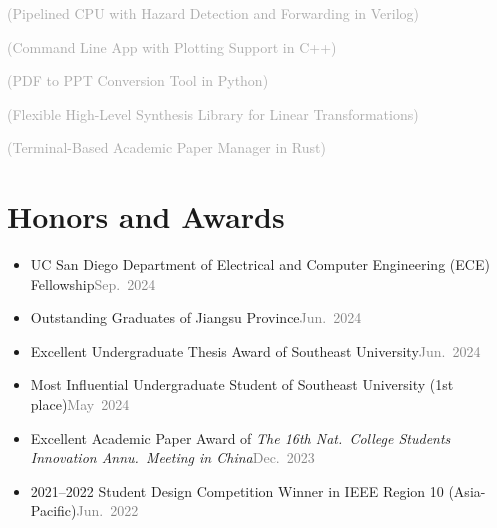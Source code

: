 \documentclass{color-cv}
\begin{document}
\begin{enumerate}[label = \textcolor{\ThemeColor}{\textbf{\arabic*}.}, ref=\textcolor{\ThemeColor}{[P\arabic*]}]
  \item \label{P:arm_lite}
     \textcolor{darkgray}{(Pipelined CPU with Hazard Detection and Forwarding in Verilog)}
  \item \label{P:water_filling}
     \textcolor{darkgray}{(Command Line App with Plotting Support in C++)}
  \item \label{P:pdf2ppt}
     \textcolor{darkgray}{(PDF to PPT Conversion Tool in Python)}
  \item \label{P:flames}
     \textcolor{darkgray}{(Flexible High-Level Synthesis Library for Linear Transformations)}
  \item \label{P:termipaper}
     \textcolor{darkgray}{(Terminal-Based Academic Paper Manager in Rust)}
\end{enumerate}

\section{Honors and Awards}
\begin{itemize}
  \item UC San Diego Department of Electrical and Computer Engineering (ECE) Fellowship\hfill\textcolor{gray}{Sep.~2024}
  \item Outstanding Graduates of Jiangsu Province\hfill\textcolor{gray}{Jun.~2024}
  \item Excellent Undergraduate Thesis Award of Southeast University\hfill\textcolor{gray}{Jun.~2024}
  \item Most Influential Undergraduate Student of Southeast University (1st place)\hfill\textcolor{gray}{May~2024}
  \item Excellent Academic Paper Award of \textit{The 16th Nat.\ College Students Innovation Annu.\ Meeting in China}\hfill\textcolor{gray}{Dec.~2023} %
  \item 2021--2022 Student Design Competition Winner in IEEE Region 10 (Asia-Pacific)\hfill\textcolor{gray}{Jun.~2022}
\end{itemize}
\end{document}

